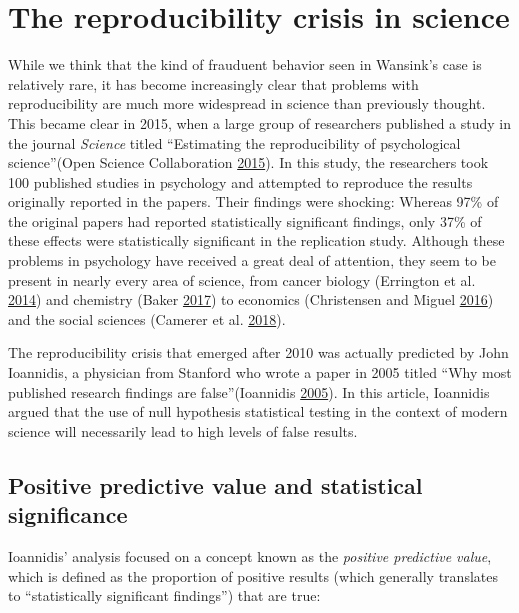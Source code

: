 \documentclass[12pt,]{book}
\theoremstyle{definition}
\theoremstyle{definition}
\theoremstyle{definition}
\theoremstyle{remark}
\begin{document}
\hypertarget{the-reproducibility-crisis-in-science}{%
\section{The reproducibility crisis in science}\label{the-reproducibility-crisis-in-science}}

While we think that the kind of frauduent behavior seen in Wansink's case is relatively rare, it has become increasingly clear that problems with reproducibility are much more widespread in science than previously thought. This became clear in 2015, when a large group of researchers published a study in the journal \emph{Science} titled ``Estimating the reproducibility of psychological science''(Open Science Collaboration \protect\hyperlink{ref-open:2015}{2015}). In this study, the researchers took 100 published studies in psychology and attempted to reproduce the results originally reported in the papers. Their findings were shocking: Whereas 97\% of the original papers had reported statistically significant findings, only 37\% of these effects were statistically significant in the replication study. Although these problems in psychology have received a great deal of attention, they seem to be present in nearly every area of science, from cancer biology (Errington et al. \protect\hyperlink{ref-erri:iorn:gunn:2014}{2014}) and chemistry (Baker \protect\hyperlink{ref-bake:2017}{2017}) to economics (Christensen and Miguel \protect\hyperlink{ref-NBERw22989}{2016}) and the social sciences (Camerer et al. \protect\hyperlink{ref-Camerer2018EvaluatingTR}{2018}).

The reproducibility crisis that emerged after 2010 was actually predicted by John Ioannidis, a physician from Stanford who wrote a paper in 2005 titled ``Why most published research findings are false''(Ioannidis \protect\hyperlink{ref-ioan:2005}{2005}). In this article, Ioannidis argued that the use of null hypothesis statistical testing in the context of modern science will necessarily lead to high levels of false results.

\hypertarget{positive-predictive-value-and-statistical-significance}{%
\subsection{Positive predictive value and statistical significance}\label{positive-predictive-value-and-statistical-significance}}

Ioannidis' analysis focused on a concept known as the \emph{positive predictive value}, which is defined as the proportion of positive results (which generally translates to ``statistically significant findings'') that are true:
\end{document}
